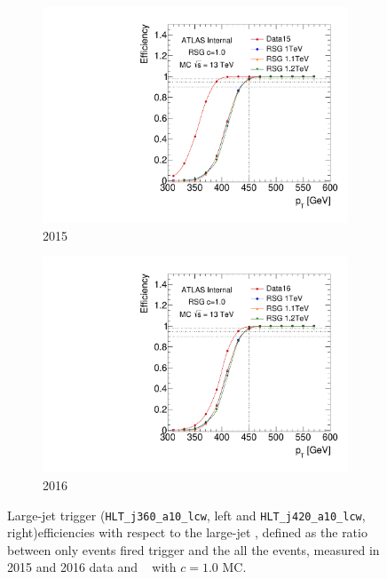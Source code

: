 \begin{figure}[htbp!]
    \captionsetup{justification=centering}
    \begin{subfigure}[b]{0.45\textwidth}
        \includegraphics[width=\textwidth,angle=-90]{figures/boosted/Trigger/trig_15_b77_pT_Efficiency.pdf}
        \caption{2015}
        \label{fig:boosted-trigger-HLT-turnon-2015}
    \end{subfigure}
    \quad
    \begin{subfigure}[b]{0.45\textwidth}
        \includegraphics[width=\textwidth,angle=-90]{figures/boosted/Trigger/trig_16_b77_pT_Efficiency.pdf}
        \caption{2016}
        \label{fig:boosted-trigger-HLT-turnon-2016}
    \end{subfigure}
  \caption{Large-\R jet trigger (\texttt{HLT\_j360\_a10\_lcw}, left and \texttt{HLT\_j420\_a10\_lcw}, right)efficiencies with respect to the large-\R jet \pt, defined as the ratio between only events fired trigger and the all the events, measured in 2015 and 2016 data and \Grav~ with $c=1.0$ MC.}
  \label{fig:boosted-trigger-HLT-turnon}
\end{figure}


